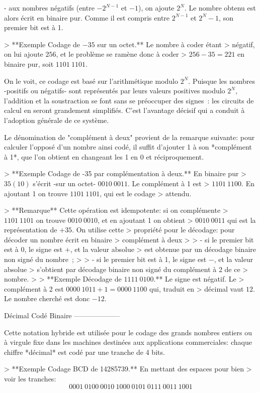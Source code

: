 -   aux nombres négatifs (entre $-2^{N-1}$ et $-1$), on ajoute $2^N$. Le
    nombre obtenu est alors écrit en binaire pur. Comme il est compris
    entre $2^{N-1}$ et $2^N-1$, son premier bit est à 1.

> **Exemple Codage de $-35$ sur un octet.** Le nombre à coder étant
> négatif, on lui ajoute $256$, et le problème se ramène donc à coder
> $256-35 = 221$ en binaire pur, soit $1101\ 1101$.

On le voit, ce codage est basé sur l'arithmétique modulo $2^N$. Puisque
les nombres -positifs ou négatifs- sont représentés par leurs valeurs
positives modulo $2^N$, l'addition et la soustraction se font sans se
préoccuper des signes : les circuits de calcul en seront grandement
simplifiés. C'est l'avantage décisif qui a conduit à l'adoption générale
de ce système.

Le dénomination de "complément à deux" provient de la remarque suivante:
pour calculer l'opposé d'un nombre ainsi codé, il suffit d'ajouter 1 à
son *complément à 1*, que l'on obtient en changeant les 1 en 0 et
réciproquement.

> **Exemple Codage de -35 par complémentation à deux.** En binaire pur
> $35 (10)$ s'écrit -sur un octet- $0010\ 0011$. Le complément à 1 est
> $1101\ 1100$. En ajoutant 1 on trouve $1101\ 1101$, qui est le codage
> attendu.

> **Remarque** Cette opération est idempotente: si on complémente
> $1101\ 1101$ on trouve $0010\ 0010$, et en ajoutant 1 on obtient
> $0010\ 0011$ qui est la représentation de $+35$. On utilise cette
> propriété pour le décodage: pour décoder un nombre écrit en binaire
> complément à deux
>
> -   si le premier bit est à 0, le signe est $+$, et la valeur absolue
>     est obtenue par un décodage binaire non signé du nombre ;
>
> -   si le premier bit est à 1, le signe est $-$, et la valeur absolue
>     s'obtient par décodage binaire non signé du complément à 2 de ce
>     nombre.
>
> **Exemple Décodage de $1111\ 0100$.** Le signe est négatif. Le
> complément à 2 est $0000\ 1011 + 1 = 0000\  1100$ qui, traduit en
> décimal vaut $12$. Le nombre cherché est donc $-12$.

Décimal Codé Binaire
--------------------

Cette notation hybride est utilisée pour le codage des grands nombres
entiers ou à virgule fixe dans les machines destinées aux applications
commerciales: chaque chiffre *décimal* est codé par une tranche de 4
bits.

> **Exemple Codage BCD de 14285739.** En mettant des espaces pour bien
> voir les tranches: $$0001\ 0100\ 0010\ 1000\ 0101\ 0111\ 0011\ 1001$$

